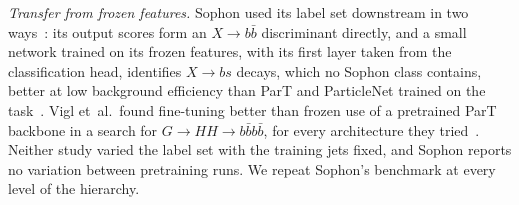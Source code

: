 \emph{Transfer from frozen features.} Sophon used its label set downstream in two
ways~\cite[Sec.~III]{sophon}: its output scores form an $X\to b\bar b$ discriminant directly, and a small
network trained on its frozen features, with its first layer taken from the classification head, identifies
$X\to bs$ decays, which no Sophon class contains, better at low background efficiency than ParT
and ParticleNet trained on the task~\cite[Fig.~2, App.~B.5]{sophon}. Vigl et~al.\ found fine-tuning
better than frozen use of a pretrained ParT backbone in a search for
$G\to HH\to b\bar b b\bar b$, for every architecture they tried~\cite{vigl}. Neither study varied the label set
with the training jets fixed, and
Sophon reports no variation between pretraining runs. We repeat Sophon's benchmark at every level of the
hierarchy.
